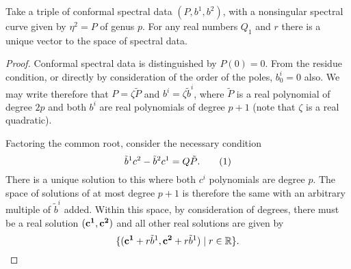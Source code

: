 \begin{lem}
Take a triple of conformal spectral data $(P,b^1,b^2)$, with a nonsingular spectral curve given by $η^2 = P$ of genus $p$. For any real numbers $Q_1$ and $r$ there is a unique vector to the space of spectral data.

\begin{proof}
Conformal spectral data is distinguished by $P(0)=0$. From the residue condition, or directly by consideration of the order of the poles, $b^i_0 = 0$ also. We may write therefore that $P= ζ\tilde{P}$ and $b^i = ζ \tilde{b}^i$, where $\tilde{P}$ is a real polynomial of degree $2p$ and both $b^i$ are real polynomials of degree $p+1$ (note that $ζ$ is a real quadratic).

Factoring the common root, consider the necessary condition
\[
\tilde{b}^1 c^2 - \tilde{b}^2 c^1 = Q\tilde{P}.\labelthis{eqn:QConformal}
\]
There is a unique solution to this where both $c^i$ polynomials are degree $p$. The space of solutions of at most degree $p+1$ is therefore the same with an arbitrary multiple of $\tilde{b}^i$ added. Within this space, by consideration of degrees, there must be a real solution $(\bf c^1, \bf c^2)$ and all other real solutions are given by
\[
\{ ({\bf c^1} + r \tilde{b}^1, {\bf c^2} + r \tilde{b}^1) \mid r\in \mathbb{R}\}.
\]


\end{proof}
\end{lem}
